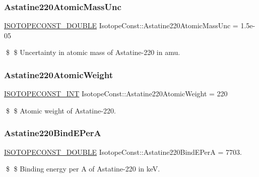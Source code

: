 \subsubsection{\texorpdfstring{Astatine220\+Atomic\+Mass\+Unc}{Astatine220AtomicMassUnc}}
{\footnotesize\ttfamily \mbox{\hyperlink{group___isotope_const-_macros_ga8f45a7272ce02c0b4c65c44636ed719a}{I\+S\+O\+T\+O\+P\+E\+C\+O\+N\+S\+T\+\_\+\+D\+O\+U\+B\+LE}} Isotope\+Const\+::\+Astatine220\+Atomic\+Mass\+Unc = 1.\+5e-\/05}

\$ \$ Uncertainty in atomic mass of Astatine-\/220 in amu. \mbox{\label{group___isotope_const-_astatine-_at220_gaaa06d6f89af9a49fbd9d06322f18176a}} 
\subsubsection{\texorpdfstring{Astatine220\+Atomic\+Weight}{Astatine220AtomicWeight}}
{\footnotesize\ttfamily \mbox{\hyperlink{group___isotope_const-_macros_ga5f18360b3e99483a35c32d789e62621c}{I\+S\+O\+T\+O\+P\+E\+C\+O\+N\+S\+T\+\_\+\+I\+NT}} Isotope\+Const\+::\+Astatine220\+Atomic\+Weight = 220}

\$ \$ Atomic weight of Astatine-\/220. \mbox{\label{group___isotope_const-_astatine-_at220_ga6f7fffe92a9e36b3680c6cb1f8520521}} 
\subsubsection{\texorpdfstring{Astatine220\+Bind\+E\+PerA}{Astatine220BindEPerA}}
{\footnotesize\ttfamily \mbox{\hyperlink{group___isotope_const-_macros_ga8f45a7272ce02c0b4c65c44636ed719a}{I\+S\+O\+T\+O\+P\+E\+C\+O\+N\+S\+T\+\_\+\+D\+O\+U\+B\+LE}} Isotope\+Const\+::\+Astatine220\+Bind\+E\+PerA = 7703.}

\$ \$ Binding energy per A of Astatine-\/220 in keV. \mbox{\label{group___isotope_const-_astatine-_at220_gabe8a80c5c220489014b3ec46d617bfaa}} 
